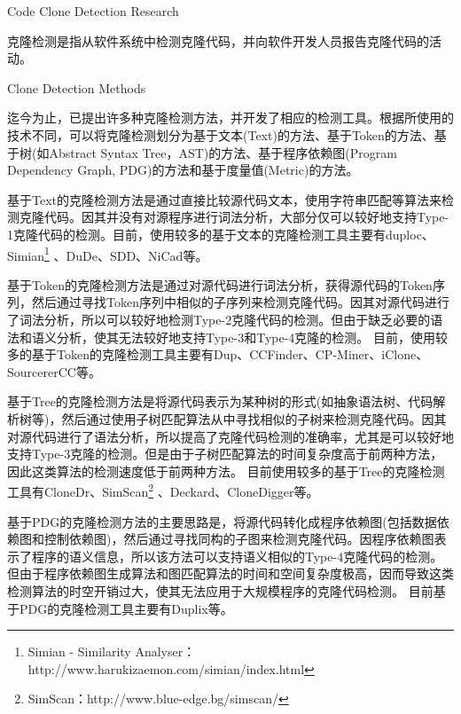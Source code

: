 {Code Clone Detection Research}
\label{ref-detection}

克隆检测是指从软件系统中检测克隆代码，并向软件开发人员报告克隆代码的活动。

{Clone Detection Methods}

迄今为止，已提出许多种克隆检测方法，并开发了相应的检测工具。根据所使用的技术不同，可以将克隆检测划分为基于文本(Text)的方法、基于Token的方法、基于树(如Abstract Syntax Tree，AST)的方法、基于程序依赖图(Program Dependency Graph, PDG)的方法和基于度量值(Metric)的方法。

基于Text的克隆检测方法是通过直接比较源代码文本，使用字符串匹配等算法来检测克隆代码。因其并没有对源程序进行词法分析，大部分仅可以较好地支持Type-1克隆代码的检测。目前，使用较多的基于文本的克隆检测工具主要有duploc\cite{ducasse1999language}、Simian\footnote{Simian - Similarity Analyser：http://www.harukizaemon.com/simian/index.html}%
、DuDe\cite{wettel2005archeology}、SDD\cite{lee2005sdd}、NiCad\cite{roy2008nicad}等。

基于Token的克隆检测方法是通过对源代码进行词法分析，获得源代码的Token序列，然后通过寻找Token序列中相似的子序列来检测克隆代码。因其对源代码进行了词法分析，所以可以较好地检测Type-2克隆代码的检测。但由于缺乏必要的语法和语义分析，使其无法较好地支持Type-3和Type-4克隆的检测。
目前，使用较多的基于Token的克隆检测工具主要有Dup\cite{baker1995finding}、CCFinder\cite{kamiya2002ccfinder}、CP-Miner\cite{li2006cp}、iClone\cite{gode2009incremental}、SourcererCC\cite{sajnani2016sourcerercc}等。

基于Tree的克隆检测方法是将源代码表示为某种树的形式(如抽象语法树、代码解析树等)，然后通过使用子树匹配算法从中寻找相似的子树来检测克隆代码。因其对源代码进行了语法分析，所以提高了克隆代码检测的准确率，尤其是可以较好地支持Type-3克隆的检测。但是由于子树匹配算法的时间复杂度高于前两种方法，因此这类算法的检测速度低于前两种方法。
目前使用较多的基于Tree的克隆检测工具有CloneDr\cite{baxter1998clone}、SimScan\footnote{SimScan：http://www.blue-edge.bg/simscan/}%
、Deckard\cite{jiang2007deckard}、CloneDigger\cite{bulychev2008duplicate}等。

基于PDG的克隆检测方法的主要思路是，将源代码转化成程序依赖图(包括数据依赖图和控制依赖图)，然后通过寻找同构的子图来检测克隆代码。因程序依赖图表示了程序的语义信息，所以该方法可以支持语义相似的Type-4克隆代码的检测。但由于程序依赖图生成算法和图匹配算法的时间和空间复杂度极高，因而导致这类检测算法的时空开销过大，使其无法应用于大规模程序的克隆代码检测。
目前基于PDG的克隆检测工具主要有Duplix\cite{krinke2001identifying}等。

